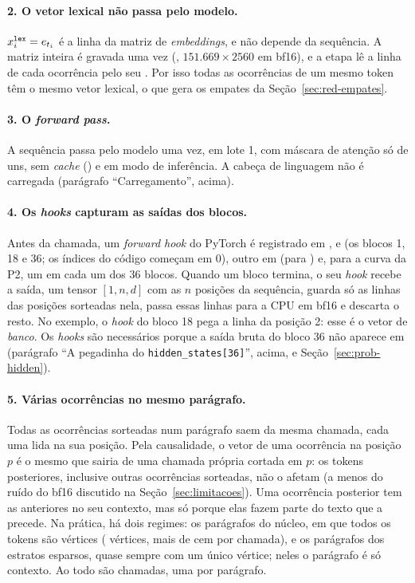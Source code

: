 \paragraph{2. O vetor lexical não passa pelo modelo.} $x^{\texttt{lex}}_i=e_{t_i}$ é a linha
 da matriz de \emph{embeddings}, e não depende da sequência. A matriz inteira é
gravada uma vez (, $151.669\times2560$ em bf16), e a etapa
 lê a linha de cada ocorrência pelo seu . Por isso todas as
ocorrências de um mesmo token têm o mesmo vetor lexical, o que gera os empates da
Seção~\ref{sec:red-empates}.

\paragraph{3. O \emph{forward pass}.} A sequência passa pelo modelo uma vez, em lote 1, com
máscara de atenção só de uns, sem \emph{cache} () e em modo de
inferência. A cabeça de linguagem não é carregada (parágrafo ``Carregamento'', acima).

\paragraph{4. Os \emph{hooks} capturam as saídas dos blocos.} Antes da chamada, um
\emph{forward hook} do PyTorch é registrado em ,  e
 (os blocos 1, 18 e 36; os índices do código começam em 0), outro em
 (para ) e, para a curva da P2, um em cada um dos 36 blocos. Quando um bloco
termina, o seu \emph{hook} recebe a saída, um tensor $[1, n, d]$ com as $n$ posições da
sequência, guarda só as linhas das posições sorteadas nela, passa essas linhas para a CPU em
bf16 e descarta o resto. No exemplo, o \emph{hook} do bloco 18 pega a linha da posição 2:
esse é o vetor  de \emph{banco}. Os \emph{hooks} são necessários porque a saída bruta
do bloco 36 não aparece em  (parágrafo ``A pegadinha do
\texttt{hidden\_states[36]}'', acima, e Seção~\ref{sec:prob-hidden}).

\paragraph{5. Várias ocorrências no mesmo parágrafo.} Todas as ocorrências sorteadas num
parágrafo saem da mesma chamada, cada uma lida na sua posição. Pela causalidade, o vetor de
uma ocorrência na posição $p$ é o mesmo que sairia de uma chamada própria cortada em $p$: os
tokens posteriores, inclusive outras ocorrências sorteadas, não o afetam (a menos do ruído do
bf16 discutido na Seção~\ref{sec:limitacoes}). Uma ocorrência posterior tem as anteriores no
seu contexto, mas só porque elas fazem parte do texto que a precede. Na prática, há dois
regimes: os \nParagrafosNucleo{} parágrafos do núcleo, em que todos os tokens são vértices
(\nVerticesNucleo{} vértices, mais de cem por chamada), e os parágrafos dos estratos esparsos,
quase sempre com um único vértice; neles o parágrafo é só contexto. Ao todo são
\nSequencias{} chamadas, uma por parágrafo.

